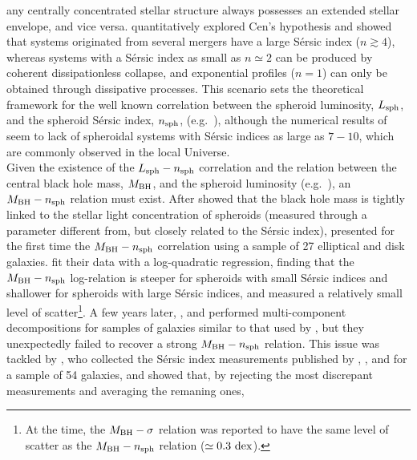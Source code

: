 \documentclass[preprint2]{emulateapj}
\begin{document}
any centrally concentrated stellar structure always possesses an extended stellar envelope, and vice versa. 
\cite{nipoti2015} quantitatively explored Cen's hypothesis and showed that 
systems originated from several mergers have a large S\'ersic index ($n \gtrsim 4$), 
whereas systems with a S\'ersic index as small as $n \simeq 2$ can be produced by coherent dissipationless collapse, 
and exponential profiles ($n=1$) can only be obtained through dissipative processes.
This scenario sets the theoretical framework for the well known correlation between the spheroid luminosity, $L_{\rm sph}$,  
and the spheroid S\'ersic index, $n_{\rm sph}$, (e.g.~\citealt{youngcurrie1994,jerjen2000,grahamguzman2003}), 
although the numerical results of \cite{nipoti2015} seem to lack of spheroidal systems with S\'ersic indices as large as $7 - 10$, 
which are commonly observed in the local Universe.  \\
Given the existence of the $L_{\rm sph} - n_{\rm sph}$ correlation 
and the relation between the central black hole mass, $M_{\rm BH}$, and the spheroid luminosity (e.g.~\citealt{magorrian1998}), 
an $M_{\rm BH} - n_{\rm sph}$ relation must exist. 
After \cite{graham2001} showed that the black hole mass is tightly linked to the stellar light concentration of spheroids 
(measured through a parameter different from, but closely related to the S\'ersic index), 
\cite{grahamdriver2007} presented for the first time the $M_{\rm BH} - n_{\rm sph}$ correlation 
using a sample of 27 elliptical and disk galaxies. 
\cite{grahamdriver2007} fit their data with a log-quadratic regression, 
finding that the $M_{\rm BH} - n_{\rm sph}$ log-relation is steeper for spheroids with small S\'ersic indices 
and shallower for spheroids with large S\'ersic indices, 
and measured a relatively small level of scatter\footnote{At the time, the $M_{\rm BH} - \sigma$ relation 
\citep{ferraresemerritt2000,gebhardt2000} was reported to have the same level of scatter as the $M_{\rm BH} - n_{\rm sph}$ 
relation ($\simeq 0.3~\rm dex$). }.
A few years later, \cite{sani2011}, \cite{vika2012} and \cite{beifiori2012} performed multi-component decompositions 
for samples of galaxies similar to that used by \cite{grahamdriver2007}, 
but they unexpectedly failed to recover a strong $M_{\rm BH} - n_{\rm sph}$ relation. 
This issue was tackled by \cite{savorgnan2013}, who collected the S\'ersic index measurements published by 
\cite{grahamdriver2007}, \cite{sani2011}, \cite{vika2012} and \cite{beifiori2012} for a sample of 54 galaxies, 
and showed that, by rejecting the most discrepant measurements and averaging the remaning ones, 
\end{document}
